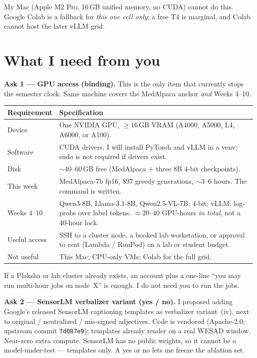 \documentclass[11pt]{article}
\begin{document}
My Mac (Apple M2 Pro, 16\,GB unified memory, no CUDA) cannot do this. Google Colab is a fallback for \emph{this one cell only}; a free T4 is marginal, and Colab cannot host the later vLLM grid.

\section{What I need from you}

{\color{Ask}\textbf{Ask 1 --- GPU access (binding).}}
This is the only item that currently stops the semester clock. Same machine covers the MedAlpaca anchor \emph{and} Weeks 4--10.

{\small
\begin{tabularx}{\textwidth}{@{}L{3.15cm}Y@{}}
\toprule
{}
\textbf{Requirement} & \textbf{Specification} \\
\midrule
Device & One NVIDIA GPU, ${\ge}16$\,GB VRAM (A4000, A5000, L4, A6000, or A100). \\
Software & CUDA drivers. I will install PyTorch and vLLM in a venv; sudo is not required if drivers exist. \\
Disk & ${\sim}40$--$60$\,GB free (MedAlpaca + three 8B 4-bit checkpoints). \\
This week & MedAlpaca-7b fp16, 897 greedy generations, ${\sim}3$--$6$ hours. The command is written. \\
Weeks 4--10 & Qwen3-8B, Llama-3.1-8B, Qwen2.5-VL-7B; 4-bit; vLLM; log-probs over label tokens. ${\approx}20$--$40$ GPU-hours \emph{in total}, not a 40-hour lock. \\
Useful access & SSH to a cluster node, a booked lab workstation, or approval to rent (Lambda / RunPod) on a lab or student budget. \\
Not useful & This Mac; CPU-only VMs; Colab for the full grid. \\
\bottomrule
\end{tabularx}
}

If a Plaksha or lab cluster already exists, an account plus a one-line ``you may run multi-hour jobs on node~X'' is enough. I do not need you to run the jobs.

\vspace{0.3em}
{\color{Ask}\textbf{Ask 2 --- SensorLM verbalizer variant (yes / no).}}
I proposed adding Google's released SensorLM captioning templates as verbalizer variant~(iv), next to original / neutralized / mis-signed adjectives. Code is vendored (Apache-2.0; upstream commit \texttt{7d087e9}); templates already render on a real WESAD window. Near-zero extra compute. SensorLM has no public weights, so it cannot be a model-under-test --- templates only. A yes or no lets me freeze the ablation set.
\end{document}
